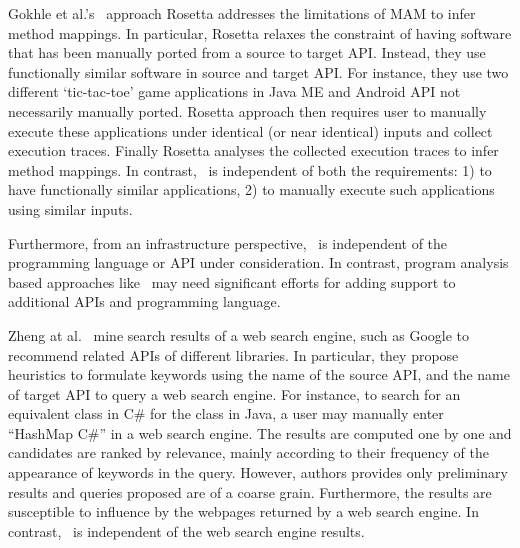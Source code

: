 Gokhle et al.'s~\cite{Gokhale2013ICSE} approach Rosetta addresses
the limitations of MAM to infer method mappings.
In particular, Rosetta relaxes the constraint of having 
software that has been manually ported from a source to target API.
Instead, they use functionally similar software in source and target API.
For instance, they use two different `tic-tac-toe' game applications in Java ME and Android API not necessarily manually ported.
Rosetta approach then requires user to manually execute these applications under identical (or near identical) inputs and collect execution traces.
Finally Rosetta analyses the collected execution traces to infer method mappings.
In contrast, \tool\ is independent of both the requirements: 1) to have functionally similar applications, 2) to manually execute such applications using similar inputs.






Furthermore, from an infrastructure perspective, \tool\ is independent of the programming language or API under consideration. In contrast, program analysis based approaches like~\cite{Zhong2010ICSE,Gokhale2013ICSE,nguyen2014statistical} may need significant
efforts for adding support to additional APIs and programming language.

Zheng at al.~\cite{Zheng2011FSE} mine search results of a web search engine,
such as Google to recommend related APIs of different libraries. 
In particular, they propose heuristics to formulate keywords using the
name of the source API, and the name of target API to query a web search engine.
For instance, to search for an equivalent class in C\# for the  class in Java,
a user may manually enter ``HashMap C\#'' in a web search engine.
The results are computed one by one and candidates are ranked by relevance,
mainly according to their frequency of the appearance of keywords in the query.
However, authors provides only preliminary results and queries proposed are of a coarse grain. 
Furthermore, the results are susceptible to influence by the webpages returned by a web search engine.
In contrast, \tool\ is independent of the web search engine results. %





